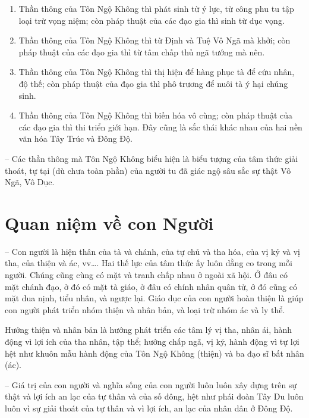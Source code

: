 \begin{enumerate}[label=\itshape\alph*\upshape/]
    \item Thần thông của Tôn Ngộ Không thì phát sinh từ ý lực, từ công phu tu tập loại trừ vọng niệm; còn pháp thuật của các đạo gia thì sinh từ dục vọng.

    \item Thần thông của Tôn Ngộ Không thì từ Định và Tuệ Vô Ngã mà khởi; còn pháp thuật của các đạo gia thì từ tâm chấp thủ ngã tướng mà nên.

    \item Thần thông của Tôn Ngộ Không thì thị hiện để hàng phục tà để cứu nhân, độ thế; còn pháp thuật của đạo gia thì phô trương để nuôi tà ý hại chúng sinh.

    \item Thần thông của Tôn Ngộ Không thì biến hóa vô cùng; còn pháp thuật của các đạo gia thì thi triển giới hạn. Đây cũng là sắc thái khác nhau của hai nền văn hóa Tây Trúc và Đông Độ.
\end{enumerate}

-- Các thần thông mà Tôn Ngộ Không biểu hiện là biểu tượng của tâm thức giải thoát, tự tại (dù chưa toàn phần) của người tu đã giác ngộ sâu sắc sự thật Vô Ngã, Vô Dục.


\section{Quan niệm về con Người} %
\label{sec:44_45_con_nguoi}

-- Con người là hiện thân của tà và chánh, của tự chủ và tha hóa, của vị kỷ và vị tha, của thiện và ác, vv\ldots. Hai thế lực của tâm thức ấy luôn dằng co trong mỗi người. Chúng cũng cùng có mặt và tranh chấp nhau ở ngoài xã hội. Ở đâu có mặt chánh đạo, ở đó có mặt tà giáo, ở đâu có chính nhân quân tử, ở đó cũng có mặt dua nịnh, tiểu nhân, và ngược lại. Giáo dục của con người hoàn thiện là giúp con người phát triển nhóm thiện và nhân bản, và loại trừ nhóm ác và ly thể.

Hướng thiện và nhân bản là hướng phát triển các tâm lý vị tha, nhân ái, hành động vì lợi ích của tha nhân, tập thể; hướng chấp ngã, vị kỷ, hành động vì tự lợi hệt như khuôn mẫu hành động của Tôn Ngộ Không (thiện) và ba đạo sĩ bất nhân (ác).

-- Giá trị của con người và nghĩa sống của con người luôn luôn xây dựng trên sự thật và lợi ích an lạc của tự thân và của số đông, hệt như phái đoàn Tây Du luôn luôn vì sự giải thoát của tự thân và vì lợi ích, an lạc của nhân dân ở Đông Độ.

